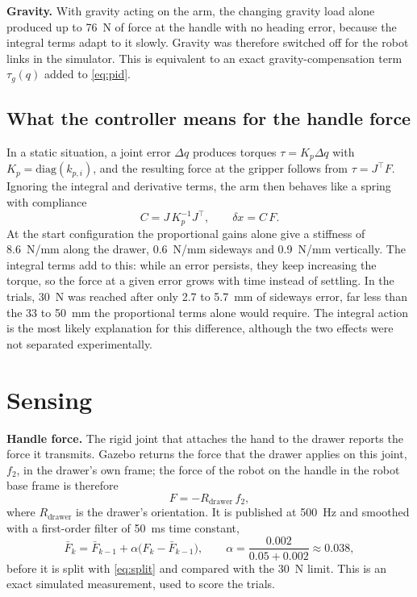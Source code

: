 \documentclass[11pt,a4paper]{article}
\begin{document}
\textbf{Gravity.} With gravity acting on the arm, the changing gravity load alone produced up to
76~N of force at the handle with no heading error, because the integral terms adapt to it slowly.
Gravity was therefore switched off for the robot links in the simulator. This is equivalent to an
exact gravity-compensation term $\tau_g(q)$ added to \cref{eq:pid}.

\subsection{What the controller means for the handle force}

In a static situation, a joint error $\Delta q$ produces torques $\tau = K_p \Delta q$ with
$K_p = \mathrm{diag}(k_{p,i})$, and the resulting force at the gripper follows from
$\tau = J^{\top} F$. Ignoring the integral and derivative terms, the arm then behaves like a spring
with compliance
\begin{equation}\label{eq:compliance}
  C = J\, K_p^{-1} J^{\top}, \qquad \delta x = C\, F .
\end{equation}
At the start configuration the proportional gains alone give a stiffness of 8.6~N/mm along the
drawer, 0.6~N/mm sideways and 0.9~N/mm vertically. The integral terms add to this: while an error
persists, they keep increasing the torque, so the force at a given error grows with time instead
of settling. In the trials, 30~N was reached after only 2.7 to 5.7~mm of sideways error, far less
than the 33 to 50~mm the proportional terms alone would require. The integral action is the most
likely explanation for this difference, although the two effects were not separated
experimentally.

\section{Sensing}\label{sec:sensing}

\textbf{Handle force.} The rigid joint that attaches the hand to the drawer reports the force it
transmits. Gazebo returns the force that the drawer applies on this joint, $f_2$, in the drawer's
own frame; the force of the robot on the handle in the robot base frame is therefore
\begin{equation}\label{eq:weld}
  F = -R_{\mathrm{drawer}}\, f_2 ,
\end{equation}
where $R_{\mathrm{drawer}}$ is the drawer's orientation. It is published at 500~Hz and smoothed with
a first-order filter of 50~ms time constant,
\begin{equation}\label{eq:filter}
  \bar F_k = \bar F_{k-1} + \alpha \bigl(F_k - \bar F_{k-1}\bigr), \qquad
  \alpha = \frac{0.002}{0.05 + 0.002} \approx 0.038 ,
\end{equation}
before it is split with \cref{eq:split} and compared with the 30~N limit. This is an exact
simulated measurement, used to score the trials.
\end{document}
